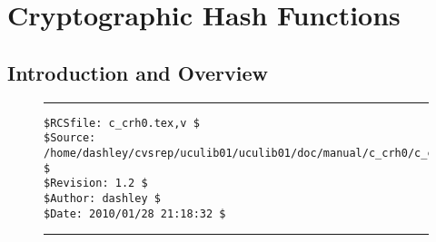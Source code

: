
\chapter{Cryptographic Hash Functions}

\label{ccrh0}

\section{Introduction and Overview}
\label{ccrh0:siov0}


\noindent\begin{figure}[!b]
\noindent\rule[-0.25in]{\textwidth}{1pt}
\begin{tiny}
\begin{verbatim}
$RCSfile: c_crh0.tex,v $
$Source: /home/dashley/cvsrep/uculib01/uculib01/doc/manual/c_crh0/c_crh0.tex,v $
$Revision: 1.2 $
$Author: dashley $
$Date: 2010/01/28 21:18:32 $
\end{verbatim}
\end{tiny}
\noindent\rule[0.25in]{\textwidth}{1pt}
\end{figure}

%
%

